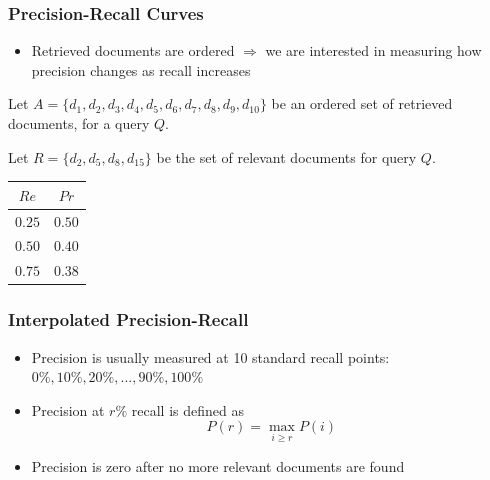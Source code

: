 \documentclass[svgnames]{beamer}
\begin{document}
\begin{frame}
  \frametitle{Precision-Recall Curves}
  
  \begin{block}{}
    \begin{itemize}
    \item Retrieved documents are ordered $\Rightarrow$ we are interested in
      measuring how precision changes as recall increases
    \end{itemize}
  \end{block}

  \begin{example}
    Let $A = \{d_1, d_2, d_3, d_4, d_5, d_6, d_7, d_8, d_9, d_{10}\}$ be an
    ordered set of retrieved documents, for a query $Q$. 

    Let $R = \{d_2, d_5,d_8, d_{15}\}$ be the set of relevant documents for query $Q$.
    \begin{center}
      \begin{tabular}{c|c}
        $Re$ & $Pr$ \\\hline
        $0.25$ & $0.50$ \\
        $0.50$ & $0.40$ \\
        $0.75$ & $0.38$ \\
      \end{tabular}
    \end{center}
  \end{example}
\end{frame}


\begin{frame}
  \frametitle{Interpolated Precision-Recall}
  
  \begin{block}{}
    \begin{itemize}
    \item Precision is usually measured at 10 standard recall points: $0\%,
      10\%, 20\%, ..., 90\%, 100\%$
    \item Precision at $r\%$ recall is defined as
      \begin{displaymath}
        P(r) = \max_{i \geq r}P(i)
      \end{displaymath}
    \item Precision is zero after no more relevant documents are found
    \end{itemize}
  \end{block}
\end{frame}
\end{document}

